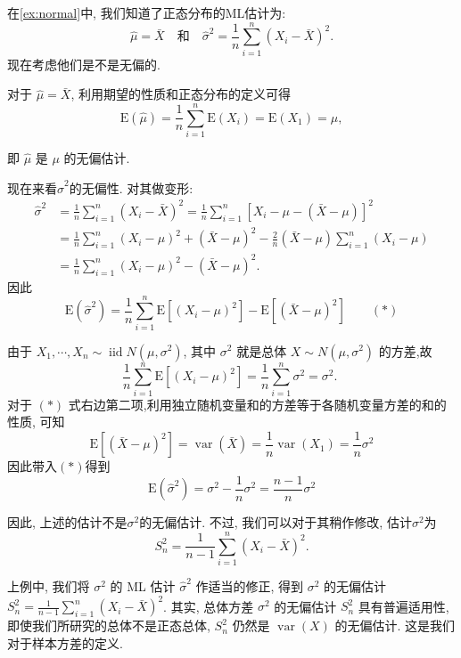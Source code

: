 \begin{example}
    在\cref{ex:normal}中, 我们知道了正态分布的ML估计为: 
    $$\hat{\mu}=\bar{X} \quad \text{和} \quad \hat{\sigma}^2=\frac{1}{n} \sum_{i=1}^n\left(X_i-\bar{X}\right)^2.$$
    现在考虑他们是不是无偏的. 

    对于 $\hat{\mu}=\bar{X}$, 利用期望的性质和正态分布的定义可得
$$
\mathrm{E}(\hat{\mu})=\frac{1}{n} \sum_{i=1}^n \mathrm{E}\left(X_i\right)=\mathrm{E}\left(X_1\right)=\mu,
$$

即 $\hat{\mu}$ 是 $\mu$ 的无偏估计.

现在来看$\hat\sigma^2$的无偏性. 对其做变形: 
$$\begin{aligned} \hat{\sigma}^2 & =\frac{1}{n} \sum_{i=1}^n\left(X_i-\bar{X}\right)^2=\frac{1}{n} \sum_{i=1}^n\left[X_i-\mu-(\bar{X}-\mu)\right]^2 \\ & =\frac{1}{n} \sum_{i=1}^n\left(X_i-\mu\right)^2+(\bar{X}-\mu)^2-\frac{2}{n}(\bar{X}-\mu) \sum_{i=1}^n\left(X_i-\mu\right) \\ & =\frac{1}{n} \sum_{i=1}^n\left(X_i-\mu\right)^2-(\bar{X}-\mu)^2 .\end{aligned}$$
因此
$$\mathrm{E}\left(\hat{\sigma}^2\right)=\frac{1}{n} \sum_{i=1}^n \mathrm{E}\left[\left(X_i-\mu\right)^2\right]-\mathrm{E}\left[(\bar{X}-\mu)^2\right]\qquad(*)$$

由于 $X_1, \cdots, X_n \sim \operatorname{iid} N\left(\mu, \sigma^2\right)$, 其中 $\sigma^2$ 就是总体 $X \sim N\left(\mu, \sigma^2\right)$ 的方差,故
$$
\frac{1}{n} \sum_{i=1}^n \mathrm{E}\left[\left(X_i-\mu\right)^2\right]=\frac{1}{n} \sum_{i=1}^n \sigma^2=\sigma^2 \text {. }
$$
对于 $(*)$ 式右边第二项,利用独立随机变量和的方差等于各随机变量方差的和的性质, 可知
$$
\mathrm{E}\left[(\bar{X}-\mu)^2\right]=\operatorname{var}(\bar{X})=\frac{1}{n} \operatorname{var}\left(X_1\right)=\frac{1}{n} \sigma^2
$$
因此带入$(*)$得到
$$\mathrm{E}\left(\hat{\sigma}^2\right)=\sigma^2-\frac{1}{n} \sigma^2=\frac{n-1}{n} \sigma^2$$

因此, 上述的估计不是$\sigma^2$的无偏估计. 不过, 我们可以对于其稍作修改, 估计$\sigma^2$为$$S_n^2=\frac{1}{n-1} \sum_{i=1}^n\left(X_i-\bar{X}\right)^2.$$
\end{example}

上例中, 我们将 $\sigma^2$ 的 ML 估计 $\hat{\sigma}^2$ 作适当的修正, 得到 $\sigma^2$ 的无偏估计 $S_n^2=\frac{1}{n-1} \sum_{i=1}^n\left(X_i-\bar{X}\right)^2$. 其实, 总体方差 $\sigma^2$ 的无偏估计 $S_n^2$ 具有普遍适用性, 即使我们所研究的总体不是正态总体, $S_n^2$ 仍然是 $\operatorname{var}(X)$ 的无偏估计. 这是我们对于样本方差的定义. 

